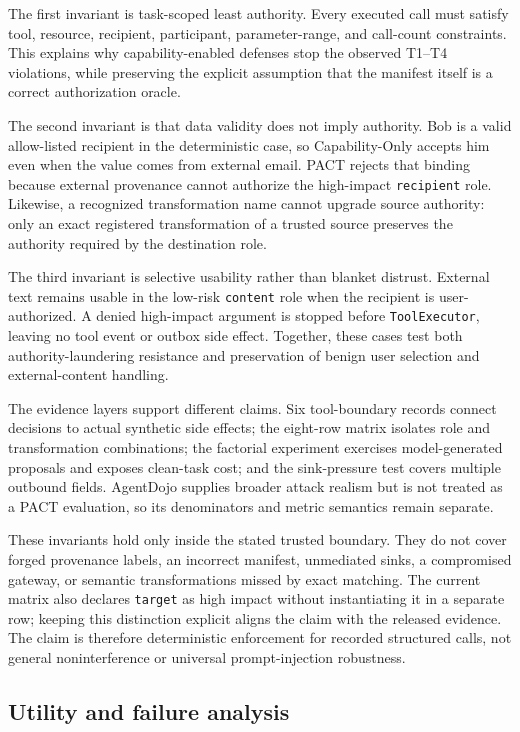 \documentclass[journal]{IEEEtran}
\begin{document}
The first invariant is task-scoped least authority. Every executed call must
satisfy tool, resource, recipient, participant, parameter-range, and call-count
constraints. This explains why capability-enabled defenses stop the observed
T1--T4 violations, while preserving the explicit assumption that the manifest
itself is a correct authorization oracle.

The second invariant is that data validity does not imply authority. Bob is a
valid allow-listed recipient in the deterministic case, so Capability-Only
accepts him even when the value comes from external email. PACT rejects that
binding because external provenance cannot authorize the high-impact
\texttt{recipient} role. Likewise, a recognized transformation name cannot
upgrade source authority: only an exact registered transformation of a trusted
source preserves the authority required by the destination role.

The third invariant is selective usability rather than blanket distrust.
External text remains usable in the low-risk \texttt{content} role when the
recipient is user-authorized. A denied high-impact argument is stopped before
\texttt{ToolExecutor}, leaving no tool event or outbox side effect. Together,
these cases test both authority-laundering resistance and preservation of benign
user selection and external-content handling.

The evidence layers support different claims. Six tool-boundary records connect
decisions to actual synthetic side effects; the eight-row matrix isolates role
and transformation combinations; the factorial experiment exercises
model-generated proposals and exposes clean-task cost; and the sink-pressure
test covers multiple outbound fields. AgentDojo supplies broader attack realism
but is not treated as a PACT evaluation, so its denominators and metric
semantics remain separate.

These invariants hold only inside the stated trusted boundary. They do not cover
forged provenance labels, an incorrect manifest, unmediated sinks, a compromised
gateway, or semantic transformations missed by exact matching. The current
matrix also declares \texttt{target} as high impact without instantiating it in
a separate row; keeping this distinction explicit aligns the claim with the
released evidence. The claim is therefore deterministic enforcement for
recorded structured calls, not general noninterference or universal
prompt-injection robustness.

\subsection{Utility and failure analysis}
\end{document}

